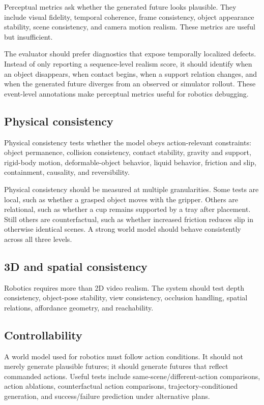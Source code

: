 \documentclass[sigconf,review,anonymous]{acmart}
\begin{document}
Perceptual metrics ask whether the generated future looks plausible. They include visual fidelity, temporal coherence, frame consistency, object appearance stability, scene consistency, and camera motion realism. These metrics are useful but insufficient.

The evaluator should prefer diagnostics that expose temporally localized defects. Instead of only reporting a sequence-level realism score, it should identify when an object disappears, when contact begins, when a support relation changes, and when the generated future diverges from an observed or simulator rollout. These event-level annotations make perceptual metrics useful for robotics debugging.

\subsection{Physical consistency}

Physical consistency tests whether the model obeys action-relevant constraints: object permanence, collision consistency, contact stability, gravity and support, rigid-body motion, deformable-object behavior, liquid behavior, friction and slip, containment, causality, and reversibility.

Physical consistency should be measured at multiple granularities. Some tests are local, such as whether a grasped object moves with the gripper. Others are relational, such as whether a cup remains supported by a tray after placement. Still others are counterfactual, such as whether increased friction reduces slip in otherwise identical scenes. A strong world model should behave consistently across all three levels.

\subsection{3D and spatial consistency}

Robotics requires more than 2D video realism. The system should test depth consistency, object-pose stability, view consistency, occlusion handling, spatial relations, affordance geometry, and reachability.

\subsection{Controllability}

A world model used for robotics must follow action conditions. It should not merely generate plausible futures; it should generate futures that reflect commanded actions. Useful tests include same-scene/different-action comparisons, action ablations, counterfactual action comparisons, trajectory-conditioned generation, and success/failure prediction under alternative plans.
\end{document}
